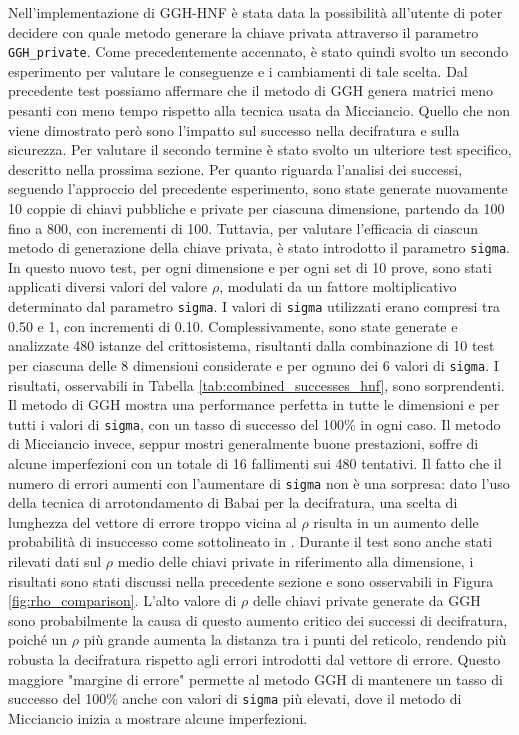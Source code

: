 Nell'implementazione di GGH-HNF è stata data la possibilità all'utente di poter decidere
con quale metodo generare la chiave privata attraverso il parametro \texttt{GGH\_private}.
Come precedentemente accennato, è stato quindi svolto un secondo esperimento per valutare 
le conseguenze e i cambiamenti di tale scelta. Dal precedente test possiamo affermare
che il metodo di GGH genera matrici meno pesanti con meno tempo rispetto alla tecnica
usata da Micciancio. Quello che non viene dimostrato però sono l'impatto sul successo
nella decifratura e sulla sicurezza. Per valutare il secondo termine è stato svolto un ulteriore 
test specifico, descritto nella prossima sezione. 
Per quanto riguarda l'analisi dei successi, seguendo l'approccio del precedente esperimento,
sono state generate nuovamente 10 
coppie di chiavi pubbliche e private per ciascuna dimensione, 
partendo da 100 fino a 800, con incrementi di 100.
Tuttavia, per valutare l'efficacia di ciascun metodo di generazione della chiave privata, 
è stato introdotto il parametro \texttt{sigma}.
In questo nuovo test, per ogni dimensione e per ogni set di 10 
prove, sono stati applicati diversi valori del valore $\rho$, modulati da un fattore 
moltiplicativo determinato dal parametro \texttt{sigma}. 
I valori di \texttt{sigma} utilizzati erano compresi tra 0.50 e 1, con incrementi di 0.10. 
Complessivamente, sono state generate e analizzate 480 istanze del crittosistema, 
risultanti dalla combinazione di 10 test per ciascuna delle 8 dimensioni considerate e 
per ognuno dei 6 valori di \texttt{sigma}.
I risultati, osservabili in Tabella \ref{tab:combined_successes_hnf}, sono sorprendenti. 
Il metodo di GGH mostra una performance perfetta in tutte le dimensioni e per tutti i valori 
di \texttt{sigma}, con un tasso di successo del 100\% in ogni caso. Il metodo di 
Micciancio invece, seppur mostri generalmente buone prestazioni, soffre di alcune 
imperfezioni con un totale di 16 fallimenti sui 480 tentativi. Il fatto che il numero di errori
aumenti con l'aumentare di \texttt{sigma} non è una sorpresa: dato l'uso della
tecnica di arrotondamento di Babai per la decifratura, una scelta di lunghezza del 
vettore di errore troppo vicina al $\rho$ risulta in un aumento delle probabilità di insuccesso 
come sottolineato in \cite[Sezione 3.1]{HNF04}. 
Durante il test sono anche stati rilevati dati sul $\rho$ medio delle chiavi private 
in riferimento alla dimensione, i risultati sono stati discussi nella precedente sezione e 
sono osservabili in Figura \ref{fig:rho_comparison}. 
L'alto valore di $\rho$ delle chiavi private generate da GGH sono probabilmente la causa 
di questo aumento critico dei successi di decifratura, poiché un $\rho$ più grande aumenta 
la distanza tra i punti del reticolo, rendendo più robusta la decifratura rispetto agli 
errori introdotti dal vettore di errore. Questo maggiore "margine di errore" permette 
al metodo GGH di mantenere un tasso di successo del 100\% anche con valori di \texttt{sigma} 
più elevati, dove il metodo di Micciancio inizia a mostrare alcune imperfezioni. 




